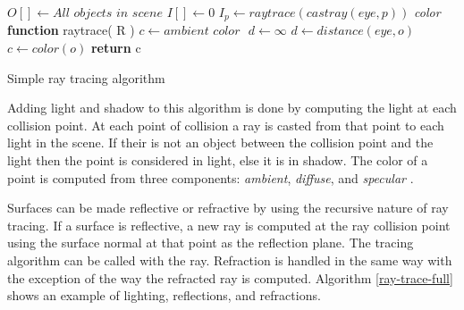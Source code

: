 \documentclass[12pt,a4paper,oneside]{article}
\begin{document}
\begin{algorithm}[H]
\begin{algorithmic}[1]
\STATE $O[ ] \gets \textit{All objects in scene}$ 
\STATE $I[] \gets 0$ 
\STATE
{}
	\STATE $I_{p} \gets raytrace( castray( eye, p ))$
\ENDFOR
\STATE 
\STATE \textit{color} \textbf{function} raytrace(  R )
	\STATE $c  \gets \textit{ambient color } $
	\STATE $d \gets \infty $
				\STATE $d \gets distance( \textit{eye}, o )$
				\STATE $c \gets color( o )$
			\ENDIF
		\ENDIF
	\ENDFOR
	\STATE \textbf{return} c

\end{algorithmic}
\caption{Simple ray tracing algorithm}
\label{ray-trace}
\end{algorithm}

Adding light and shadow to this algorithm is done by computing the light at each collision point.  At each point of collision a ray is casted from that point to each light in the scene.  If their is not an object between the collision point and the light then the point is considered in light, else it is in shadow.  The color of a point is computed from three components: \textit{ambient}, \textit{diffuse}, and \textit{specular} \cite{kalinini:2008}.

Surfaces can be made reflective or refractive by using the recursive nature of ray tracing.  If a surface is reflective, a new ray is computed at the ray collision point using the surface normal at that point as the reflection plane.  The tracing algorithm can be called with the ray.  Refraction is handled in the same way with the exception of the way the refracted ray is computed.  Algorithm \ref{ray-trace-full} shows an example of lighting, reflections, and refractions.  
  
\end{document}
